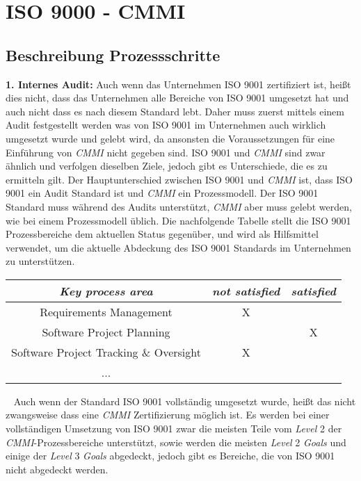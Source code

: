 \section{ISO 9000 - CMMI}
\label{sec:cmmi}
\subsection{Beschreibung Prozessschritte}
\textbf{1. Internes Audit:}
\newline
Auch wenn das Unternehmen ISO 9001 zertifiziert ist, heißt dies nicht, dass das Unternehmen alle Bereiche von ISO 9001 umgesetzt hat und auch nicht dass es nach diesem Standard lebt. Daher muss zuerst mittels einem Audit festgestellt werden was von ISO 9001 im Unternehmen auch wirklich umgesetzt wurde und gelebt wird, da ansonsten die Voraussetzungen für eine Einführung von \emph{CMMI} nicht gegeben sind. ISO 9001 und \emph{CMMI} sind zwar ähnlich und verfolgen dieselben Ziele, jedoch gibt es Unterschiede, die es zu ermitteln gilt. Der Hauptunterschied zwischen ISO 9001 und \emph{CMMI} ist, dass ISO 9001 ein Audit Standard ist und \emph{CMMI} ein Prozessmodell. Der ISO 9001 Standard muss  während des Audits unterstützt, \emph{CMMI} aber muss gelebt werden, wie bei einem Prozessmodell üblich.
\newline
\newline
Die nachfolgende Tabelle stellt die ISO 9001 Prozessbereiche dem aktuellen Status gegenüber, und wird als Hilfsmittel verwendet, um die aktuelle Abdeckung des ISO 9001 Standards im Unternehmen zu unterstützen.
\bgroup
\def\arraystretch{1.5}%
\begin{tabularx}{\textwidth}{ c | c | c }
	\hline
	\textbf{\emph{Key process area}} & 
	\textbf{\emph{not satisfied}} & 
	\textbf{\emph{satisfied}} 
	\\ \hline
	Requirements Management &
	X & 
	\\ \hline
	Software Project Planning &
	& X 
	\\ \hline
	Software Project Tracking \& Oversight &
	X & 
	\\ \hline
	... & & 
	\\ \hline
\end{tabularx}
\egroup
\ \newline
Auch wenn der Standard ISO 9001 vollständig umgesetzt wurde, heißt das nicht zwangsweise dass eine \emph{CMMI} Zertifizierung möglich ist. Es werden bei einer vollständigen Umsetzung von ISO 9001 zwar die meisten Teile vom \emph{Level} 2 der \emph{CMMI}-Prozessbereiche unterstützt, sowie werden die meisten \emph{Level} 2 \emph{Goals} und einige der \emph{Level} 3 \emph{Goals} abgedeckt, jedoch gibt es Bereiche, die von ISO 9001 nicht abgedeckt werden.
